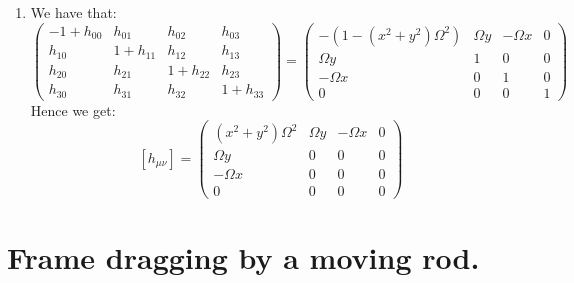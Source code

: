 \documentclass[10pt,a4paper]{article}
\begin{document}
\begin{enumerate}
\item We have that:
\[
\begin{pmatrix}
-1 + h_{00} & h_{01} & h_{02} & h_{03}\\
h_{10} & 1 + h_{11} & h_{12} & h_{13}\\
h_{2 0} & h_{21} & 1 + h_{22} & h_{23}\\
h_{30} & h_{31} & h_{32} & 1 + h_{33}
\end{pmatrix}
= 
\begin{pmatrix}
-(1 - (x^2 + y^2) \Omega^2) & \Omega y & -\Omega x & 0\\
\Omega y & 1 & 0 & 0\\
-\Omega x & 0 & 1 & 0\\
0 & 0 & 0 & 1
\end{pmatrix}
\]
Hence we get:
\[
[h_{\mu \nu}] = \begin{pmatrix}
(x^2 + y^2) \Omega^2 & \Omega y & - \Omega x & 0\\
\Omega y & 0 & 0 & 0\\
-\Omega x & 0 & 0 & 0\\
0 & 0 & 0 & 0
\end{pmatrix}
\]

\end{enumerate}

\section{Frame dragging by a moving rod.}
\end{document}

